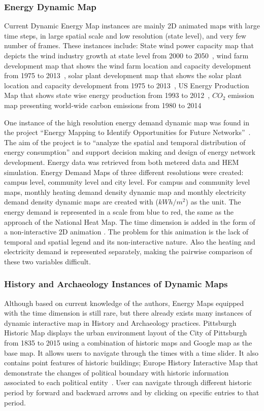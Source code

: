 \documentclass[hidelinks,12pt]{article}
\begin{document}
\subsubsection{Energy Dynamic Map}
Current Dynamic Energy Map instances are mainly 2D animated maps with
large time steps, in large spatial scale and low resolution (state
level), and very few number of frames. These instances include: State
wind power capacity map that depicts the wind industry growth at state
level from 2000 to 2050~\cite{DOEWind}, wind farm development map that
shows the wind farm location and capacity development from 1975 to
2013~\cite{DOEWindFarm}, solar plant development map that shows the
solar plant location and capacity development from 1975 to
2013~\cite{DOESolarPlant}, US Energy Production Map that shows
state wise energy production from 1993 to 2012~\cite{DOEEnergyProduct},
$CO_2$ emission map presenting world-wide carbon emissions from 1980 to
2014~\cite{CO2Atlas}

One instance of the high resolution energy demand dynamic map was
found in the project ``Energy Mapping to Identify Opportunities for
Future Networks''~\cite{Diaz2013}. The aim of the project is to
``analyze the spatial and temporal distribution of energy
consumption'' and support decision making and design of energy network
development. Energy data was retrieved from both metered data and HEM
simulation. Energy Demand Maps of three different resolutions were
created: campus level, community level and city level. For campus and
community level maps, monthly heating demand density dynamic map and
monthly electricity demand density dynamic maps are created with
($kWh/m^2$) as the unit. The energy demand is represented in a scale
from blue to red, the same as the approach of the National Heat
Map. The time dimension is added in the form of a non-interactive 2D
animation . The problem for this animation is the lack of temporal and
spatial legend and its non-interactive nature. Also the heating and
electricity demand is represented separately, making the pairwise
comparison of these two variables difficult.

\subsubsection{History and Archaeology Instances of Dynamic Maps}
Although based on current knowledge of the authors, Energy Maps
equipped with the time dimension is still rare, but there already
exists many instances of dynamic interactive map in History and
Archaeology practices. Pittsburgh Historic Map displays the urban
environment layout of the City of Pittsburgh from 1835 to 2015 using a
combination of historic maps and Google map as the base map. It allows
users to navigate through the times with a time slider. It also
contains point features of historic buildings\cite{EsriHistory2015};
Europe History Interactive Map that demonstrate the changes of
political boundary with historic information associated to each
political entity~\cite{Worldology2009}. User can navigate through
different historic period by forward and backward arrows and by
clicking on specific entries to that period.
\end{document}
